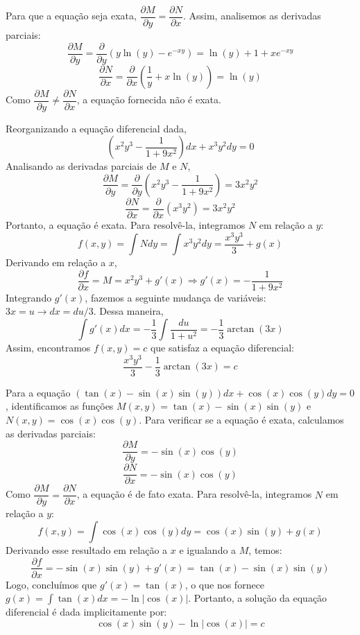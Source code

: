 \documentclass[oneside,12pt,a4paper]{report}
\begin{document}
    \begin{resolucao}
        \itemresolucao Para que a equação seja exata, $\dfrac{\partial M}{\partial y}=\dfrac{\partial N}{\partial x}$. Assim, analisemos as derivadas parciais:
        \[\frac{\partial M}{\partial y}=\frac{\partial}{\partial y}(y\ln(y)-e^{-xy})=\ln(y)+1+xe^{-xy}\]
        \[\frac{\partial N}{\partial x}=\frac{\partial}{\partial x}\left(\frac{1}{y}+x\ln(y)\right)=\ln(y)\]
        Como $\dfrac{\partial M}{\partial y}\neq\dfrac{\partial N}{\partial x}$, a equação fornecida não é exata.

        \itemresolucao Reorganizando a equação diferencial dada,
        \[\left(x^2y^3-\frac{1}{1+9x^2}\right)dx+x^3y^2dy=0\]
        Analisando as derivadas parciais de $M$ e $N$,
        \[\frac{\partial M}{\partial y}=\frac{\partial}{\partial y}\left(x^2y^3-\frac{1}{1+9x^2}\right)=3x^2y^2\]
        \[\frac{\partial N}{\partial x}=\frac{\partial}{\partial x}(x^3y^2)=3x^2y^2\]
        Portanto, a equação é exata. Para resolvê-la, integramos $N$ em relação a $y$:
        \[f(x,y)=\int Ndy=\int x^3y^2dy=\frac{x^3y^3}{3}+g(x)\]
        Derivando em relação a $x$, 
        \[\frac{\partial f}{\partial x}=M=x^2y^3+g'(x)\Rightarrow g'(x)=-\frac{1}{1+9x^2}\]
        Integrando $g'(x)$, fazemos a seguinte mudança de variáveis: $3x=u\rightarrow dx=du/3$. Dessa maneira,
        \[\int g'(x)dx=-\frac{1}{3}\int \frac{du}{1+u^2}=-\frac{1}{3}\arctan(3x)\]
        Assim, encontramos $f(x,y)=c$ que satisfaz a equação diferencial:
        \[\boxed{\frac{x^3y^3}{3}-\frac{1}{3}\arctan(3x)=c}\]

        \itemresolucao Para a equação $(\tan(x)-\sin(x)\sin(y))dx+\cos(x)\cos(y)dy=0$, identificamos as funções $M(x,y)=\tan(x)-\sin(x)\sin(y)$ e $N(x,y)=\cos(x)\cos(y)$. 
        Para verificar se a equação é exata, calculamos as derivadas parciais:
        \[\frac{\partial M}{\partial y}=-\sin(x)\cos(y)\]
        \[\frac{\partial N}{\partial x}=-\sin(x)\cos(y)\]
        Como $\dfrac{\partial M}{\partial y}=\dfrac{\partial N}{\partial x}$, a equação é de fato exata. Para resolvê-la, integramos $N$ em relação a $y$:
        \[f(x,y)=\int\cos(x)\cos(y)dy=\cos(x)\sin(y)+g(x)\]
        Derivando esse resultado em relação a $x$ e igualando a $M$, temos:
        \[\frac{\partial f}{\partial x}=-\sin(x)\sin(y)+g'(x)=\tan(x)-\sin(x)\sin(y)\]
        Logo, concluímos que $g'(x)=\tan(x)$, o que nos fornece $g(x)=\int\tan(x)dx=-\ln|\cos(x)|$. Portanto, a solução da equação diferencial é dada implicitamente por:
        \[\boxed{\cos(x)\sin(y)-\ln|\cos(x)|=c}\]


\end{resolucao}
\end{document}
